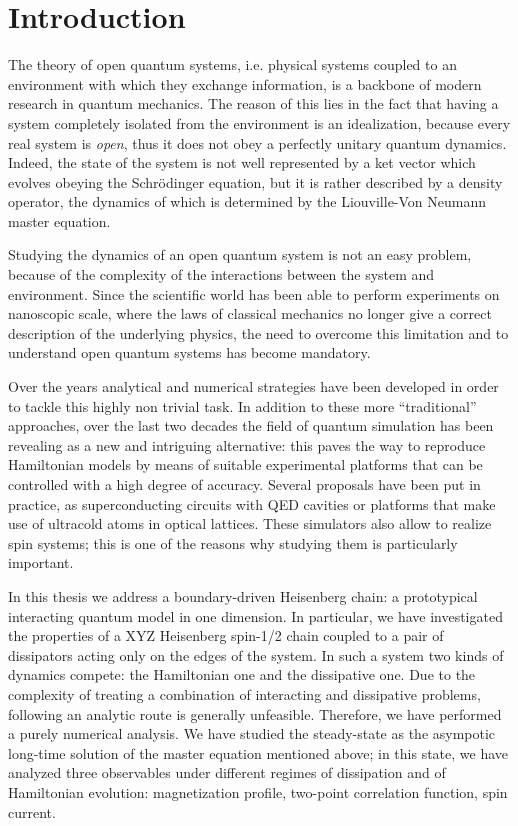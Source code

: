 \chapter*{Introduction}
 
\label{Introduction}

The theory of open quantum systems, i.e. physical systems coupled to an environment with which they exchange information, is a backbone of modern research in quantum mechanics. The reason of this lies in the fact that having a system completely isolated from the environment is an idealization, because every real system is \emph{open}, thus it does not obey a perfectly unitary quantum dynamics. Indeed, the state of the system is not well represented by a ket vector which evolves obeying the Schr\"{o}dinger equation, but it is rather described by a density operator, the dynamics of which is determined by the Liouville-Von Neumann master equation.

Studying the dynamics of an open quantum system is not an easy problem, because of the complexity of the interactions between the system and environment. Since the scientific world has been able to perform experiments on nanoscopic scale, where the laws of classical mechanics no longer give a correct description of the underlying physics, the need to overcome this limitation and to understand open quantum systems has become mandatory.

Over the years analytical and numerical strategies have been developed in order to tackle this highly non trivial task. In addition to these more ``traditional'' approaches, over the last two decades the field of quantum simulation has been revealing as a new and intriguing alternative: this paves the way to reproduce Hamiltonian models by means of suitable experimental platforms that can be controlled with a high degree of accuracy. Several proposals have been put in practice, as superconducting circuits with QED cavities or platforms that make use of ultracold atoms in optical lattices. These simulators also allow to realize spin systems; this is one of the reasons why studying them is particularly important.

In this thesis we address a boundary-driven Heisenberg chain: a prototypical interacting quantum model in one dimension. In particular, we have investigated the properties of a XYZ Heisenberg spin-1/2 chain coupled to a pair of dissipators acting only on the edges of the system. In such a system two kinds of dynamics compete: the Hamiltonian one and the dissipative one. Due to the complexity of treating a combination of interacting and dissipative problems, following an analytic route is generally unfeasible. Therefore, we have performed a purely numerical analysis. We have studied the steady-state as the asympotic long-time solution of the master equation mentioned above; in this state, we have analyzed three observables under different regimes of dissipation and of Hamiltonian evolution: magnetization profile, two-point correlation function, spin current.

